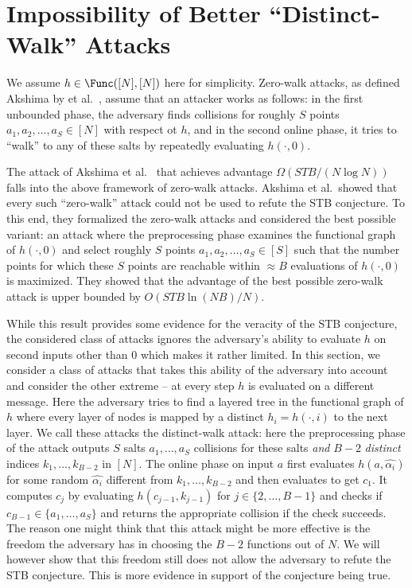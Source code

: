 \section{Impossibility of Better ``Distinct-Walk'' Attacks}\label{app:mw}
We assume $h\in \Func([N],[N])$ here for simplicity. 
Zero-walk attacks, as defined Akshima by et al.~\cite{AkshimaCDW20}, assume that an attacker works as follows: in the first unbounded phase, the adversary finds collisions for roughly $S$ points $a_1,a_2,\ldots,a_S\in [N]$ with respect ot $h$, and in the second online phase, it tries to ``walk'' to any of these salts by repeatedly evaluating $h(\cdot,0)$. 

The attack of Akshima et al.~\cite{AkshimaCDW20} that achieves advantage $\Omega({STB}/{(N\log N)})$ falls into the above framework of zero-walk attacks. Akshima et al.\ showed that every such ``zero-walk'' attack could not be used to refute the STB conjecture. To this end, they formalized the zero-walk attacks and considered the best possible variant: an attack where the preprocessing phase examines the functional graph of $h(\cdot,0)$ and select roughly $S$ points $a_1,a_2,\ldots,a_S\in [S]$ such that the number points for which these $S$ points are reachable within $\approx B$ evaluations of $h(\cdot,0)$ is maximized. They showed that the advantage of the best possible zero-walk attack is upper bounded by $O({STB\ln(NB)/N})$.

While this result provides some evidence for the veracity of the STB conjecture, the considered class of attacks ignores the adversary's ability to evaluate $h$ on second inputs other than $0$ which makes it rather limited. In this section, we consider a class of attacks that takes this ability of the adversary into account and consider the other extreme -- at every step $h$ is evaluated on a different message. Here the adversary tries to find a layered tree in the functional graph of $h$ where every layer of nodes is mapped by a distinct $h_i=h(\cdot,i)$ to the next layer. 
We call these attacks the distinct-walk attack: here the preprocessing phase of the attack outputs $S$ salts $a_1,\ldots,a_S$ collisions for these salts \emph{and} $B-2$ \emph{distinct} indices $k_1,\ldots,k_{B-2}$ in $[N]$. The online phase on input $a$ first evaluates $h(a,\hat{\alpha_i})$ for some random $\hat{\alpha_i}$ different from $k_1,\ldots,k_{B-2}$ and then evaluates to get $c_1$. It computes $c_{j}$ by evaluating $h(c_{j-1},k_{j-1})$ for $j\in \{2,\ldots,B-1\}$ and checks if $c_{B-1}\in \{a_1,\ldots,a_S\}$ and returns the appropriate collision if the check succeeds. The reason one might think that this attack might be more effective is the freedom the adversary has in choosing the $B-2$ functions out of $N$. We will however show that this freedom still does not allow the adversary to refute the STB conjecture. This is more evidence in support of the conjecture being true.

